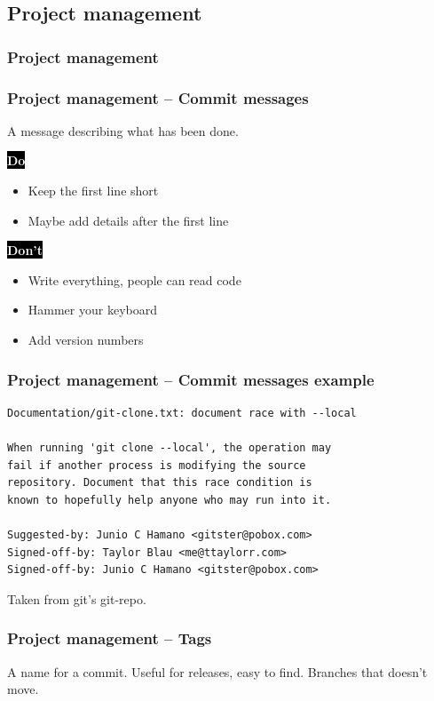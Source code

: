 \documentclass{beamer}
\newcommand{\keyword}[1]{\hspace{-1.0em}\colorbox{black}{\textcolor{white}{\textbf{#1}\vphantom{Ep}}}\vspace{0.2em}} %
\begin{document}
\subsection{Project management}

\begin{frame}[fragile]
  \frametitle{Project management}
\end{frame}

\begin{frame}[fragile]
  \frametitle{Project management -- Commit messages}
  \vspace{1em}

  A message describing what has been done.
  \vspace{1em}

  \keyword{Do}
  \begin{itemize}
    \item Keep the first line short
    \item Maybe add details after the first line
  \end{itemize}
  \vspace{1em}

  \keyword{Don't}
  \begin{itemize}
    \item Write everything, people can read code
    \item Hammer your keyboard
    \item Add version numbers
  \end{itemize}
  \vspace{1em}

\end{frame}

\begin{frame}[fragile]
  \frametitle{Project management -- Commit messages example}
  \small
  \begin{verbatim}
Documentation/git-clone.txt: document race with --local

When running 'git clone --local', the operation may
fail if another process is modifying the source
repository. Document that this race condition is
known to hopefully help anyone who may run into it.

Suggested-by: Junio C Hamano <gitster@pobox.com>
Signed-off-by: Taylor Blau <me@ttaylorr.com>
Signed-off-by: Junio C Hamano <gitster@pobox.com>
  \end{verbatim}
  Taken from git's git-repo.
\end{frame}

\begin{frame}[fragile]
  \frametitle{Project management -- Tags}
  
  A name for a commit. Useful for releases, easy to find.
  \vspace{1em}
  Branches that doesn't move.

\end{frame}
\end{document}
